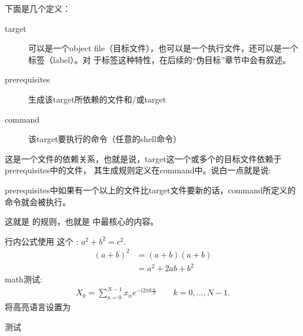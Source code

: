 \documentclass[letterpaper,10pt,english]{sphinxmanual}
\begin{document}
下面是几个定义：
\begin{description}
\item[{target}] \leavevmode
可以是一个object file（目标文件），也可以是一个执行文件，还可以是一个标签（label）。对
于标签这种特性，在后续的“伪目标”章节中会有叙述。

\item[{prerequisites}] \leavevmode
生成该target所依赖的文件和/或target

\item[{command}] \leavevmode
该target要执行的命令（任意的shell命令）

\end{description}

这是一个文件的依赖关系，也就是说，target这一个或多个的目标文件依赖于prerequisites中的文件，
其生成规则定义在command中。说白一点就是说:

%
\begin{sphinxVerbatim}[commandchars=\\\{\}]
prerequisites中如果有一个以上的文件比target文件要新的话，command所定义的命令就会被执行。
\end{sphinxVerbatim}

这就是  的规则，也就是  中最核心的内容。


行内公式使用  这个 : \(a^2 + b^2 = c^2\).
\begin{equation*}
\begin{split}(a + b)^2  &=  (a + b)(a + b) \\
           &=  a^2 + 2ab + b^2\end{split}
\end{equation*}
 math测试:
\begin{equation*}
\begin{split}X_k =  \sum_{n=0}^{N-1} x_n e^{-{i 2\pi k \frac{n}{N}}} \qquad k = 0,\dots,N-1.\end{split}
\end{equation*}
将高亮语言设置为 

测试 

%
\begin{sphinxVerbatim}[commandchars=\\\{\},numbers=left,firstnumber=1,stepnumber=1]
   
   
 
\end{sphinxVerbatim}
\end{document}
